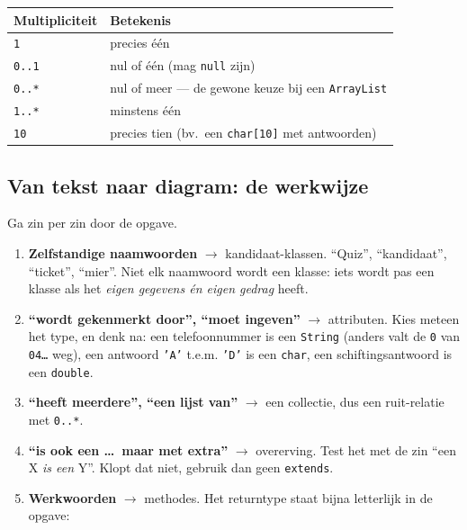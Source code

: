 \documentclass[a4paper,11pt]{article}
\begin{document}
\begin{center}
    \begin{tabular}{@{}lp{7.4cm}@{}}
        \toprule
        \textbf{Multipliciteit} & \textbf{Betekenis}                                         \\
        \midrule
        \texttt{1}              & precies \'e\'en                                            \\
        \texttt{0..1}           & nul of \'e\'en (mag \texttt{null} zijn)                    \\
        \texttt{0..*}           & nul of meer --- de gewone keuze bij een \texttt{ArrayList} \\
        \texttt{1..*}           & minstens \'e\'en                                           \\
        \texttt{10}             & precies tien (bv.\ een \texttt{char[10]} met antwoorden)   \\
        \bottomrule
    \end{tabular}
\end{center}

\subsection{Van tekst naar diagram: de werkwijze}

Ga zin per zin door de opgave.

\begin{enumerate}
    \item \textbf{Zelfstandige naamwoorden} $\rightarrow$ kandidaat-klassen.
          ``Quiz'', ``kandidaat'', ``ticket'', ``mier''. Niet elk naamwoord wordt
          een klasse: iets wordt pas een klasse als het \emph{eigen gegevens
              \'en eigen gedrag} heeft.
    \item \textbf{``wordt gekenmerkt door'', ``moet ingeven''} $\rightarrow$
          attributen. Kies meteen het type, en denk na:
          een telefoonnummer is een \texttt{String} (anders valt de \texttt{0}
          van \texttt{04\dots} weg), een antwoord \texttt{'A'} t.e.m. \texttt{'D'}
          is een \texttt{char}, een schiftingsantwoord is een \texttt{double}.
    \item \textbf{``heeft meerdere'', ``een lijst van''} $\rightarrow$ een
          collectie, dus een ruit-relatie met \texttt{0..*}.
    \item \textbf{``is ook een \dots\ maar met extra''} $\rightarrow$ overerving.
          Test het met de zin ``een X \emph{is een} Y''. Klopt dat niet, gebruik
          dan geen \texttt{extends}.
    \item \textbf{Werkwoorden} $\rightarrow$ methodes. Het returntype staat
          bijna letterlijk in de opgave:
\end{enumerate}
\end{document}
